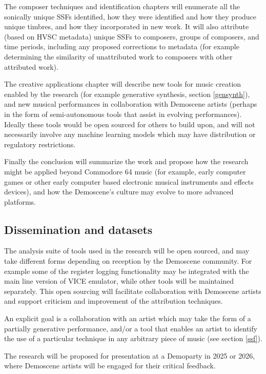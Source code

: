 \documentclass[10pt]{article}
\begin{document}
\begin{multicols*}{2}
The composer techniques and identification chapters will enumerate all the sonically unique SSFs identified, how they were identified and how they produce unique timbres, and how they incorporated in new work. It will also attribute (based on HVSC metadata) unique SSFs to composers, groups of composers, and time periods, including any proposed corrections to metadata (for example determining the similarity of unattributed work to composers with other attributed work).

The creative applications chapter will describe new tools for music creation enabled by the research (for example generative synthesis, section \ref{gensynth}), and new musical performances in collaboration with Demoscene artists (perhaps in the form of semi-autonomous tools that assist in evolving performances). Ideally these tools would be open sourced for others to build upon, and will not necessarily involve any machine learning models which may have distribution or regulatory restrictions.

Finally the conclusion will summarize the work and propose how the research might be applied beyond Commodore 64 music (for example, early computer games or other early computer based electronic musical instruments and effects devices), and how the Demoscene's culture may evolve to more advanced platforms.

\subsection{Dissemination and datasets}
\label{dissem}

The analysis suite of tools used in the research will be open sourced, and may take different forms depending on reception by the Demoscene community. For example some of the register logging functionality may be integrated with the main line version of VICE emulator, while other tools will be maintained separately. This open sourcing will facilitate collaboration with Demoscene artists and support criticism and improvement of the attribution techniques.

An explicit goal is a collaboration with an artist which may take the form of a partially generative performance, and/or a tool that enables an artist to identify the use of a particular technique in any arbitrary piece of music (see section \ref{ssf}).

The research will be proposed for presentation at a Demoparty in 2025 or 2026, where Demoscene artists will be engaged for their critical feedback.


\end{multicols*}
\end{document}
